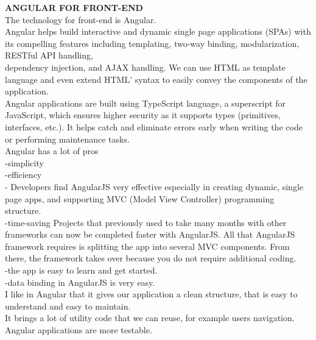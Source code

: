 \documentclass{scrartcl}
\begin{document}
\textbf{ANGULAR FOR FRONT-END} \\
The technology for front-end is Angular.\\
Angular helps build interactive and dynamic single page applications (SPAs) with its compelling features including templating, two-way binding, modularization, RESTful API handling,\\ dependency injection, and AJAX handling. We can use HTML as template language and even extend HTML’ syntax to easily convey the components of the application.\\
Angular applications are built using TypeScript language, a superscript for JavaScript, which ensures higher security as it supports types (primitives, interfaces, etc.). It helps catch and eliminate errors early when writing the code or performing maintenance tasks.\\
Angular has a lot of pros\\
-simplicity\\
-efficiency\\
- Developers find AngularJS very effective especially in creating dynamic, single page apps, and supporting MVC (Model View Controller) programming structure.\\
-time-saving Projects that previously used to take many months with other frameworks can now be completed faster with AngularJS. All that AngularJS framework requires is splitting the app into several MVC components. From there, the framework takes over because you do not require additional coding.\\
-the app is easy to learn and get started.\\
-data binding in AngularJS is very easy.\\
I like in Angular that it gives our application a clean structure, that is easy to understand and easy to maintain.\\
It brings a lot of utility code that we can reuse, for example users navigation. Angular applications are more testable.\\
\end{document}
